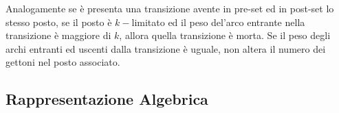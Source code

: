 \documentclass{article}
\numberwithin{equation}{subsection}
\begin{document}
Analogamente se è presenta una transizione avente in pre-set ed in post-set lo stesso posto, se il posto è $k-$limitato ed il peso del'arco entrante nella transizione è maggiore 
di $k$, allora quella transizione è morta. Se il peso degli archi entranti ed uscenti dalla transizione è uguale, non altera il numero dei gettoni nel posto associato. 
\begin{center}
\end{center} 

\subsection{Rappresentazione Algebrica}
\end{document}
